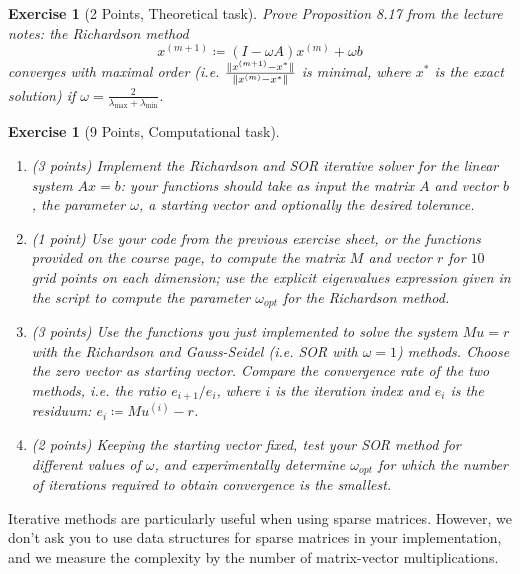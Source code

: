 \documentclass[11pt,a4paper,english,hyperref]{article}
\newcounter{aufgabeNummer}
\theoremstyle{break}   %
\newtheorem{Aufgabe}[aufgabeNummer]{Exercise}
\theoremstyle{definition}
\DeclarePairedDelimiter\norm{\lVert}{\rVert}
\begin{document}
\begin{Aufgabe}[2 Points, Theoretical task]
  Prove Proposition 8.17 from the lecture notes: the Richardson method
  \begin{equation*}
    x^{(m+1)}\coloneqq  \left( I-\omega A \right) x^{(m)} + \omega b
  \end{equation*}
  converges with maximal order (i.e. $\frac{\norm{x^{(m+1)} -x^{*}}}{\norm{x^{(m)} -x^{*}}}$ is minimal, where $x^*$ is the exact solution) if $\omega=\frac{2}{\lambda_{\max}+\lambda_{\min}}$.
\end{Aufgabe}
\begin{Aufgabe}[9 Points, Computational task]
  \begin{enumerate}
    \item (3 points) Implement the Richardson and SOR iterative solver for the linear system $Ax=b$:
    your functions should take as input the matrix $A$ and vector $b$, the parameter $\omega$, a starting vector and optionally the desired tolerance.
    \item (1 point) Use your code from the previous exercise sheet, or the functions provided on the course page, to compute the matrix $M$ and vector $r$ for $10$ grid points on each dimension;
    use the explicit eigenvalues expression given in the script to compute the parameter $\omega_{opt}$ for the Richardson method.
    \item (3 points) Use the functions you just implemented to solve the system $Mu=r$ with the Richardson and Gauss-Seidel (i.e. SOR with $\omega=1$) methods. Choose the zero vector as starting vector.
    Compare the convergence rate of the two methods, i.e. the ratio $e_{i+1}/e_i$, where $i$ is the iteration index and $e_i$ is the residuum: $e_i \coloneqq M u^{(i)} - r$.
    \item (2 points) Keeping the starting vector fixed, test your SOR method for different values of $\omega$, and experimentally determine $\omega_{opt}$ for which the number of iterations required to obtain convergence is the smallest.
  \end{enumerate}
\end{Aufgabe}
\begin{remark*}
  Iterative methods are particularly useful when using sparse matrices. However, we don't ask you to use data structures for sparse matrices in your implementation, and we measure the complexity by the number of matrix-vector multiplications.
\end{remark*}
\end{document}

